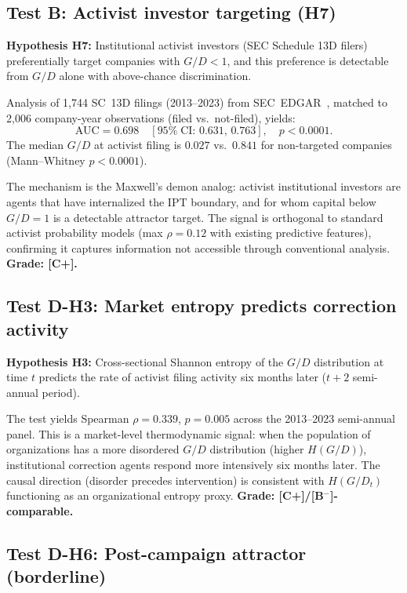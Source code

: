 \documentclass[11pt]{article}
\theoremstyle{remark}
\begin{document}
\subsection{Test B: Activist investor targeting (H7)}
\label{sec:org:activist}

\textbf{Hypothesis H7:} Institutional activist investors (SEC Schedule 13D filers)
preferentially target companies with $G/D < 1$, and this preference is
detectable from $G/D$ alone with above-chance discrimination.

Analysis of 1,744 SC~13D filings (2013--2023) from SEC~EDGAR~\cite{SECEDGAR},
matched to 2,006 company-year observations (filed vs.\ not-filed), yields:
\[
  \text{AUC} = 0.698 \quad [95\%\;\text{CI: }0.631,\,0.763],
  \quad p < 0.0001.
\]
The median $G/D$ at activist filing is $0.027$ vs.\ $0.841$ for non-targeted
companies (Mann--Whitney $p < 0.0001$).

The mechanism is the Maxwell's demon analog: activist institutional investors
are agents that have internalized the IPT boundary, and for whom capital
below $G/D = 1$ is a detectable attractor target.
The signal is orthogonal to standard activist probability models
(max $\rho = 0.12$ with existing predictive features), confirming
it captures information not accessible through conventional analysis.
\textbf{Grade: [C+].}

\subsection{Test D-H3: Market entropy predicts correction activity}
\label{sec:org:entropy}

\textbf{Hypothesis H3:} Cross-sectional Shannon entropy of the $G/D$
distribution at time $t$ predicts the rate of activist filing activity
six months later ($t+2$ semi-annual period).

The test yields Spearman $\rho = 0.339$, $p = 0.005$ across the 2013--2023
semi-annual panel.
This is a market-level thermodynamic signal: when the population of
organizations has a more disordered $G/D$ distribution (higher $H(G/D)$),
institutional correction agents respond more intensively six months later.
The causal direction (disorder precedes intervention) is consistent with
$H(G/D_t)$ functioning as an organizational entropy proxy.
\textbf{Grade: [C+]/[B$^-$]-comparable.}

\subsection{Test D-H6: Post-campaign attractor (borderline)}
\label{sec:org:attractor}
\end{document}

